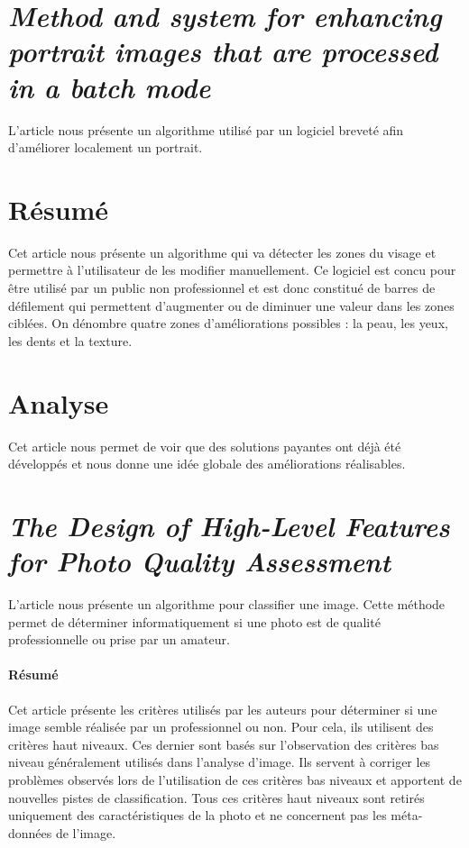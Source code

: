 \documentclass[11pt, french]{report-rd-info}
\begin{document}
\section{\emph{Method and system for enhancing portrait images that are processed in a batch mode}}
L'article \cite{Caner2009} nous présente un algorithme utilisé par un logiciel breveté afin d'améliorer localement un portrait.

\section{Résumé}
Cet article nous présente un algorithme qui va détecter les zones du visage et permettre à l'utilisateur de les modifier manuellement. Ce logiciel est concu pour être utilisé par un public non professionnel et est donc constitué de barres de défilement qui permettent d'augmenter ou de diminuer une valeur dans les zones ciblées. On dénombre quatre zones d'améliorations possibles : la peau, les yeux, les dents et la texture.

\section{Analyse}
Cet article nous permet de voir que des solutions payantes ont déjà été développés et nous donne une idée globale des améliorations réalisables.

\section{\emph{The Design of High-Level Features for Photo Quality Assessment}}
L'article \cite{Ke} nous présente un algorithme pour classifier une image. Cette méthode permet de déterminer informatiquement si une photo est de qualité professionnelle ou prise par un amateur.

\paragraph{Résumé}
Cet article présente les critères utilisés par les auteurs pour déterminer si une image semble réalisée par un professionnel ou non. Pour cela, ils utilisent des critères haut niveaux. Ces dernier sont basés sur l'observation des critères bas niveau généralement utilisés dans l'analyse d'image. Ils servent à corriger les problèmes observés lors de l'utilisation de ces critères bas niveaux et apportent de nouvelles pistes de classification.
Tous ces critères haut niveaux sont retirés uniquement des caractéristiques de la photo et ne concernent pas les méta-données de l'image.
\end{document}
